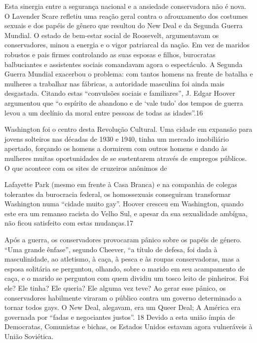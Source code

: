  \par 
Esta sinergia entre a segurança nacional e a ansiedade conservadora não é nova. O Lavender Scare refletiu uma reação geral contra o afrouxamento dos costumes sexuais e dos papéis de gênero que resultou do New Deal e da Segunda Guerra Mundial. O estado de bem-estar social de Roosevelt, argumentavam os conservadores, minou a energia e o vigor patriarcal da nação. Em vez de maridos robustos e pais firmes controlando as suas esposas e filhos, burocratas balbuciantes e assistentes sociais comandavam agora o espectáculo. A Segunda Guerra Mundial exacerbou o problema: com tantos homens na frente de batalha e mulheres a trabalhar nas fábricas, a autoridade masculina foi ainda mais desgastada. Citando estas “convulsões sociais e familiares”, J. Edgar Hoover argumentou que “o espírito de abandono e de ‘vale tudo’ dos tempos de guerra levou a um declínio da moral entre pessoas de todas as idades”.{\color{blue}16}
 \par 
Washington foi o centro desta Revolução Cultural. Uma cidade em expansão para jovens solteiros nas décadas de 1930 e 1940, tinha um mercado imobiliário apertado, forçando os homens a dormirem com outros homens e dando às mulheres muitas oportunidades de se sustentarem através de empregos públicos. O que acontece com os sites de cruzeiros anônimos de
 \par 
Lafayette Park (mesmo em frente à Casa Branca) e na companhia de colegas tolerantes da burocracia federal, os homossexuais conseguiram transformar Washington numa “cidade muito gay”. Hoover cresceu em Washington, quando este era um remanso racista do Velho Sul, e apesar da sua sexualidade ambígua, não ficou satisfeito com estas mudanças.{\color{blue}17}
 \par 
Após a guerra, os conservadores provocaram pânico sobre os papéis de género. “Uma grande ênfase”, segundo Cheever, “a título de defesa, foi dada à masculinidade, ao atletismo, à caça, à pesca e às roupas conservadoras, mas a esposa solitária se perguntou, olhando, sobre o marido em seu acampamento de caça, e o marido se perguntou com quem dividiu um tosco leito de pinheiros. Foi ele? Ele tinha? Ele queria? Ele alguma vez teve? Ao gerar esse pânico, os conservadores habilmente viraram o público contra um governo determinado a tornar todos gays. O New Deal, alegavam, era um Queer Deal; A América era governada por “fadas e negociantes justos”. {\color{blue}18} Devido a esta união ímpia de Democratas, Comunistas e bichas, os Estados Unidos estavam agora vulneráveis ​​à União Soviética.
